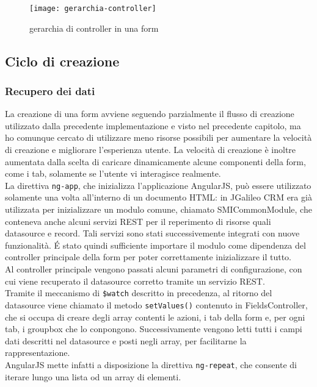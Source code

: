 \begin{figure}[h]
	\centering
	\texttt{[image: gerarchia-controller]}
	\caption{gerarchia di controller in una form}
	\label{fig:ger-contr}
\end{figure}

\subsection{Ciclo di creazione}
\subsubsection{Recupero dei dati}
La creazione di una form avviene seguendo parzialmente il flusso di creazione utilizzato dalla precedente implementazione e visto nel precedente capitolo, ma ho comunque cercato di utilizzare meno risorse possibili per aumentare la velocità di creazione e migliorare l'esperienza utente. La velocità di creazione è inoltre aumentata dalla scelta di caricare dinamicamente alcune componenti della form, come i tab, solamente se l'utente vi interagisce realmente.\\
La direttiva \lstinline[language=HTML]!ng-app!, che inizializza l'applicazione AngularJS, può essere utilizzato solamente una volta all'interno di un documento HTML: in JGalileo CRM era già utilizzata per inizializzare un modulo comune, chiamato SMICommonModule, che conteneva anche alcuni servizi REST per il reperimento di risorse quali datasource e record. Tali servizi sono stati successivemente integrati con nuove funzionalità. \'E stato quindi sufficiente importare il modulo come dipendenza del controller principale della form per poter correttamente inizializzare il tutto.\\
Al controller principale vengono passati alcuni parametri di configurazione, con cui viene recuperato il datasource corretto tramite un servizio REST. \\
Tramite il meccanismo di \lstinline[language=HTML]!$watch! descritto in precedenza, al ritorno del datasource
viene chiamato il metodo \lstinline[language=HTML]!setValues()! contenuto in FieldsController, che si occupa di creare degli array contenti le azioni, i tab della form e, per ogni tab, i groupbox che lo conpongono. Successivamente vengono letti tutti i campi dati descritti nel datasource e posti negli array, per facilitarne la rappresentazione.\\ AngularJS mette infatti a disposizione la direttiva \lstinline[language=HTML]!ng-repeat!, che consente di iterare lungo una lista od un array di elementi. \\

